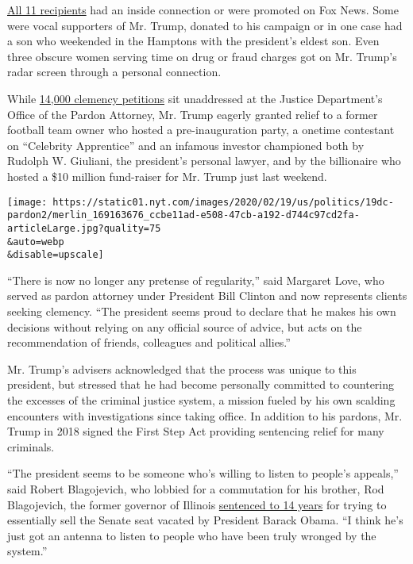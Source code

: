 \href{https://www.nytimes.com/2020/02/18/us/politics/trump-pardons.html}{All
11 recipients} had an inside connection or were promoted on Fox News.
Some were vocal supporters of Mr. Trump, donated to his campaign or in
one case had a son who weekended in the Hamptons with the president's
eldest son. Even three obscure women serving time on drug or fraud
charges got on Mr. Trump's radar screen through a personal connection.

While \href{https://www.justice.gov/pardon/clemency-statistics}{14,000
clemency petitions} sit unaddressed at the Justice Department's Office
of the Pardon Attorney, Mr. Trump eagerly granted relief to a former
football team owner who hosted a pre-inauguration party, a onetime
contestant on ``Celebrity Apprentice'' and an infamous investor
championed both by Rudolph W. Giuliani, the president's personal lawyer,
and by the billionaire who hosted a \$10 million fund-raiser for Mr.
Trump just last weekend.

\texttt{[image: https://static01.nyt.com/images/2020/02/19/us/politics/19dc-pardon2/merlin\_169163676\_ccbe11ad-e508-47cb-a192-d744c97cd2fa-articleLarge.jpg?quality=75\\\&auto=webp\\\&disable=upscale]}

``There is now no longer any pretense of regularity,'' said Margaret
Love, who served as pardon attorney under President Bill Clinton and now
represents clients seeking clemency. ``The president seems proud to
declare that he makes his own decisions without relying on any official
source of advice, but acts on the recommendation of friends, colleagues
and political allies.''

Mr. Trump's advisers acknowledged that the process was unique to this
president, but stressed that he had become personally committed to
countering the excesses of the criminal justice system, a mission fueled
by his own scalding encounters with investigations since taking office.
In addition to his pardons, Mr. Trump in 2018 signed the First Step Act
providing sentencing relief for many criminals.

``The president seems to be someone who's willing to listen to people's
appeals,'' said Robert Blagojevich, who lobbied for a commutation for
his brother, Rod Blagojevich, the former governor of Illinois
\href{https://www.nytimes.com/2011/12/08/us/blagojevich-expresses-remorse-in-courtroom-speech.html}{sentenced
to 14 years} for trying to essentially sell the Senate seat vacated by
President Barack Obama. ``I think he's just got an antenna to listen to
people who have been truly wronged by the system.''

